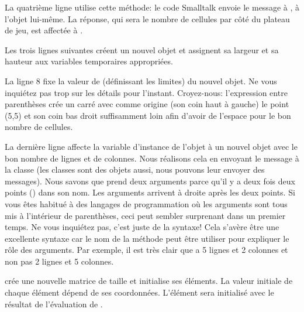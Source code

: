 \documentclass[a4paper,10pt,twoside]{book}
\begin{document}
La quatrième ligne utilise cette méthode: le code Smalltalk  envoie le message  à , \cad à l'objet lui-même. La réponse, qui sera le nombre de cellules par côté du plateau de jeu, est affectée à .

Les trois lignes suivantes créent un nouvel objet  et assignent sa largeur et sa hauteur aux variables temporaires appropriées.

La ligne 8 fixe la valeur de  (d\'efinissant les limites) du nouvel objet. Ne vous inquiétez pas trop sur les détails pour l'instant. Croyez-nous: l'expression entre parenthèses crée un carré avec comme origine (\ie son coin haut à gauche) le point (5,5) et son coin bas droit suffisamment loin afin d'avoir de l'espace pour le bon nombre de cellules.

La dernière ligne affecte la variable d'instance  de l'objet
 \`a un nouvel objet  avec le bon nombre de lignes et de colonnes.
Nous réalisons cela en envoyant le message  à la classe  (les classes sont des objets aussi, nous pouvons leur envoyer des messages).
Nous savons que  prend deux arguments parce qu'il y a deux fois deux points (\ct{:}) dans son nom. Les arguments arrivent à droite après les deux points.
Si vous êtes habitué à des langages de programmation où les arguments sont tous mis à l'intérieur de parenthèses, ceci peut sembler surprenant dans un premier temps. Ne vous inquiétez pas, c'est juste de la syntaxe!
Cela s'avère être une excellente syntaxe car le nom de la méthode peut être utiliser pour expliquer le rôle des arguments. Par exemple, il est très clair que  a 5 lignes et 2 colonnes et non pas 2 lignes et 5 colonnes.

 crée une nouvelle matrice de taille  et initialise ses éléments. La valeur initiale de chaque élément dépend de ses coordonnées. L'élément  sera initialisé avec le résultat de l'évaluation de .  
\end{document}
